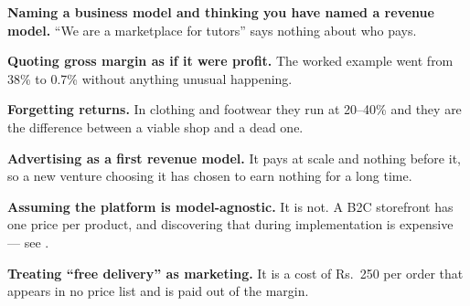 \begin{pitfall}
\begin{tight}
  \item \textbf{Naming a business model and thinking you have named a revenue
        model.} ``We are a marketplace for tutors'' says nothing about who pays.
  \item \textbf{Quoting gross margin as if it were profit.} The worked example
        went from 38\% to 0.7\% without anything unusual happening.
  \item \textbf{Forgetting returns.} In clothing and footwear they run at 20--40\%
        and they are the difference between a viable shop and a dead one.
  \item \textbf{Advertising as a first revenue model.} It pays at scale and
        nothing before it, so a new venture choosing it has chosen to earn
        nothing for a long time.
  \item \textbf{Assuming the platform is model-agnostic.} It is not. A B2C
        storefront has one price per product, and discovering that during
        implementation is expensive --- see .
  \item \textbf{Treating ``free delivery'' as marketing.} It is a cost of
        Rs.~250 per order that appears in no price list and is paid out of the
        margin.
\end{tight}
\end{pitfall}

